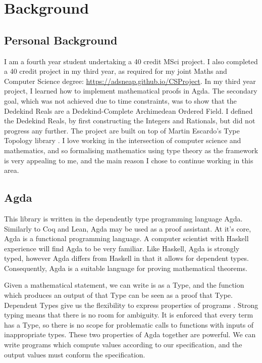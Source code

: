 \documentclass[ProjectReport]{subfiles}
\begin{document}
\section{Background}

\subsection{Personal Background}

I am a fourth year student undertaking a 40 credit MSci project. I also completed a 40 credit project in my third year, as required for my joint Maths and Computer Science degree: \url{https://adsneap.github.io/CSProject}. In my third year project, I learned how to implement mathematical proofs in Agda. The secondary goal, which was not achieved due to time constraints, was to show that the Dedekind Reals are a Dedekind-Complete Archimedean Ordered Field. I defined the Dedekind Reals, by first constructing the Integers and Rationals, but did not progress any further. The project are built on top of Martin Escardo's Type Topology library \cite{TypeTopology}. I love working in the intersection of computer science and mathematics, and so formalising mathematics using type theory as the framework is very appealing to me, and the main reason I chose to continue working in this area.

\subsection{Agda}

This library is written in the dependently type programming language Agda. Similarly to Coq and Lean, Agda may be used as a proof assistant. At it's core, Agda is a functional programming language. A computer scientist with Haskell experience will find Agda to be very familiar. Like Haskell, Agda is strongly typed, however Agda differs from Haskell in that it allows for dependent types. Consequently, Agda is a suitable language for proving mathematical theorems. 

Given a mathematical statement, we can write is as a Type, and the function which produces an output of that Type can be seen as a proof that Type. Dependent Types give us the flexibility to express properties of programs \cite{AgdaDependentTypes}. Strong typing means that there is no room for ambiguity. It is enforced that every term has a Type, so there is no scope for problematic calls to functions with inputs of inappropriate types. These two properties of Agda together are powerful. We can write programs which compute values according to our specification, and the output values must conform the specification. 
\end{document}
